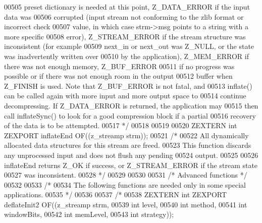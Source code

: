 \begin{DoxyCode}
00505 \textcolor{comment}{  preset dictionary is needed at this point, Z\_DATA\_ERROR if the input data was}
00506 \textcolor{comment}{  corrupted (input stream not conforming to the zlib format or incorrect check}
00507 \textcolor{comment}{  value, in which case strm->msg points to a string with a more specific}
00508 \textcolor{comment}{  error), Z\_STREAM\_ERROR if the stream structure was inconsistent (for example}
00509 \textcolor{comment}{  next\_in or next\_out was Z\_NULL, or the state was inadvertently written over}
00510 \textcolor{comment}{  by the application), Z\_MEM\_ERROR if there was not enough memory, Z\_BUF\_ERROR}
00511 \textcolor{comment}{  if no progress was possible or if there was not enough room in the output}
00512 \textcolor{comment}{  buffer when Z\_FINISH is used.  Note that Z\_BUF\_ERROR is not fatal, and}
00513 \textcolor{comment}{  inflate() can be called again with more input and more output space to}
00514 \textcolor{comment}{  continue decompressing.  If Z\_DATA\_ERROR is returned, the application may}
00515 \textcolor{comment}{  then call inflateSync() to look for a good compression block if a partial}
00516 \textcolor{comment}{  recovery of the data is to be attempted.}
00517 \textcolor{comment}{*/}
00518 
00519 
00520 ZEXTERN \textcolor{keywordtype}{int} ZEXPORT inflateEnd OF((z\_streamp strm));
00521 \textcolor{comment}{/*}
00522 \textcolor{comment}{     All dynamically allocated data structures for this stream are freed.}
00523 \textcolor{comment}{   This function discards any unprocessed input and does not flush any pending}
00524 \textcolor{comment}{   output.}
00525 \textcolor{comment}{}
00526 \textcolor{comment}{     inflateEnd returns Z\_OK if success, or Z\_STREAM\_ERROR if the stream state}
00527 \textcolor{comment}{   was inconsistent.}
00528 \textcolor{comment}{*/}
00529 
00530 
00531                         \textcolor{comment}{/* Advanced functions */}
00532 
00533 \textcolor{comment}{/*}
00534 \textcolor{comment}{    The following functions are needed only in some special applications.}
00535 \textcolor{comment}{*/}
00536 
00537 \textcolor{comment}{/*}
00538 \textcolor{comment}{ZEXTERN int ZEXPORT deflateInit2 OF((z\_streamp strm,}
00539 \textcolor{comment}{                                     int  level,}
00540 \textcolor{comment}{                                     int  method,}
00541 \textcolor{comment}{                                     int  windowBits,}
00542 \textcolor{comment}{                                     int  memLevel,}
00543 \textcolor{comment}{                                     int  strategy));}

\end{DoxyCode}
